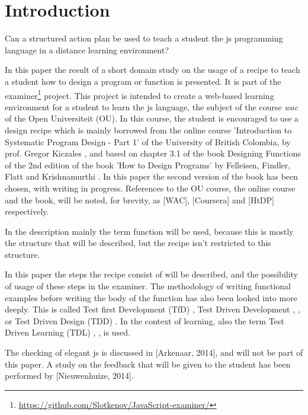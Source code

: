 \section{Introduction}

Can a structured action plan be used to teach a \gls{student} the \gls{js}
programming language in a distance learning environment?

In this paper the result of a short domain study on the usage of a recipe to
teach a \gls{student} how to design a program or function is presented.
It is part of the \gls{examiner}\footnote{\url{https://github.com/Slotkenov/JavaScript-examiner/}} project.
This project is intended to create a web-based learning environment for a \gls{student}
to learn the \gls{js} language, the subject of the course {\em \gls{wac}} of the Open Universiteit (OU).
In this course, the \gls{student} is encouraged to use a design recipe which is mainly
borrowed from the online course 'Introduction to Systematic Program Design - Part 1'
of the University of British Colombia, by prof. Gregor Kiczales
\citep{kiczales_introduction_2015},
and based on chapter 3.1 of the book Designing Functions of the 2nd edition of the book
'How to Design Programs' by Felleisen, Findler, Flatt and Krishnamurthi
\citep{felleisen_how_2015}.
In this paper the second version of the book has been chosen, with writing
in progress. References to the OU course, the online course and the book, will
be noted, for brevity, as [WAC], [Coursera] and [HtDP] respectively.

In the description mainly the term function will be used, because this is mostly
the structure that will be described, but the recipe isn't restricted to this
structure.

In this paper the steps the recipe consist of will be described, and the
possibility of usage of these steps in the \gls{examiner}.
The methodology of writing functional examples before writing the body of the function has also been looked into more deeply.
This is called Test first Development (TfD) \citep{langr_evolution_2001}, Test Driven Development
\citep{edwards_rethinking_2003}, \citep{janzen_test-driven_2008}, \citep{sommerville_software_2011} or Test Driven Design (TDD) \citep{proulx_test-driven_2009}.
In the context of learning, also the term Test Driven Learning (TDL) \citep{janzen_test-driven_2006},
\citep{proulx_test-driven_2009}, \citep{janzen_test-driven_2008} is used.

The checking of elegant \gls{js} is discussed in [Arkenaar, 2014], and will
not be part of this paper.
A study on the feedback that will be given to the \gls{student} has been performed by
[Nieuwenhuize, 2014].

